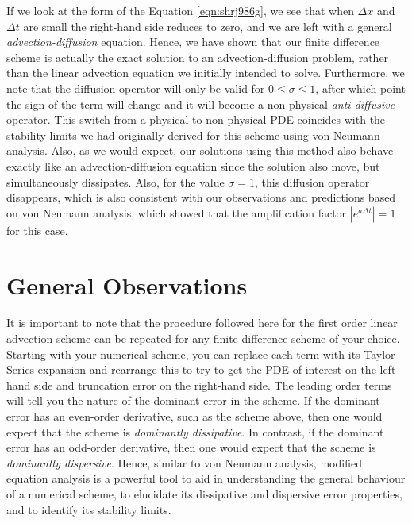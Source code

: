 If we look at the form of the Equation \ref{eqn:shrj986g}, we see that when $\Delta x$ and $\Delta t$ are small the right-hand side reduces to zero, and we are left with a general {\it advection-diffusion} equation. Hence, we have shown that our finite difference scheme is actually the exact solution to an advection-diffusion problem, rather than the linear advection equation we initially intended to solve. Furthermore, we note that the diffusion operator will only be valid for $0 \leq \sigma \leq 1$, after which point the sign of the term will change and it will become a non-physical {\it anti-diffusive} operator. This switch from a physical to non-physical PDE coincides with the stability limits we had originally derived for this scheme using von Neumann analysis. Also, as we would expect, our solutions using this method also behave exactly like an advection-diffusion equation since the solution also move, but simultaneously dissipates. Also, for the value $\sigma=1$, this diffusion operator disappears, which is also consistent with our observations and predictions based on von Neumann analysis, which showed that the amplification factor $| e^{a \Delta t} | = 1$ for this case.

\section{General Observations}
It is important to note that the procedure followed here for the first order linear advection scheme can be repeated for any finite difference scheme of your choice. Starting with your numerical scheme, you can replace each term with its Taylor Series expansion and rearrange this to try to get the PDE of interest on the left-hand side and truncation error on the right-hand side. The leading order terms will tell you the nature of the dominant error in the scheme. If the dominant error has an even-order derivative, such as the scheme above, then one would expect that the scheme is {\it dominantly dissipative}. In contrast, if the dominant error has an odd-order derivative, then one would expect that the scheme is {\it dominantly dispersive}. Hence, similar to von Neumann analysis, modified equation analysis is a powerful tool to aid in understanding the general behaviour of a numerical scheme, to elucidate its dissipative and dispersive error properties, and to identify its stability limits.

